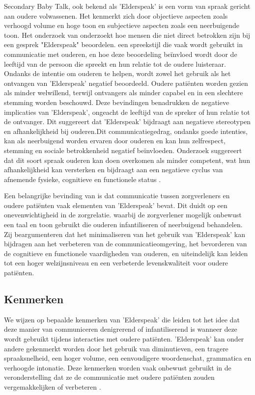 Secondary Baby Talk, ook bekend als 'Elderspeak' is een vorm van spraak gericht aan oudere volwassenen. Het kenmerkt zich door objectieve aspecten zoals verhoogd volume en hoge toon en subjectieve aspecten zoals een neerbuigende toon. Het onderzoek van \textcite{balsis2006evaluations} onderzoekt hoe mensen die niet direct betrokken zijn bij een gesprek "Elderspeak" beoordelen. een spreekstijl die vaak wordt gebruikt in communicatie met ouderen, en hoe deze beoordeling beïnvloed wordt door de leeftijd van de persoon die spreekt en hun relatie tot de oudere luisteraar. 
Ondanks de intentie om ouderen te helpen, wordt zowel het gebruik als het ontvangen van 'Elderspeak' negatief beoordeeld. Oudere patiënten worden gezien als minder welwillend, terwijl ontvangers als minder capabel en in een slechtere stemming worden beschouwd. Deze bevindingen benadrukken de negatieve implicaties van 'Elderspeak', ongeacht de leeftijd van de spreker of hun relatie tot de ontvanger. Dit suggereert dat 'Elderspeak' bijdraagt aan negatieve stereotypen en afhankelijkheid bij ouderen.Dit communicatiegedrag, ondanks goede intenties, kan als neerbuigend worden ervaren door ouderen en kan hun zelfrespect, stemming en sociale betrokkenheid negatief beïnvloeden. Onderzoek suggereert dat dit soort spraak ouderen kan doen overkomen als minder competent, wat hun afhankelijkheid kan versterken en bijdraagt aan een negatieve cyclus van afnemende fysieke, cognitieve en functionele status \autocite{balsis2006evaluations}.


Een belangrijke bevinding van \textcite{williams2005enhancing} is dat communicatie tussen zorgverleners en oudere patiënten vaak elementen van 'Elderspeak' bevat. Dit duidt op een onevenwichtigheid in de zorgrelatie. waarbij de zorgverlener mogelijk onbewust een taal en toon gebruikt die ouderen infantiliseren of neerbuigend behandelen.
 Zij beargumenteren dat het minimaliseren van het gebruik van 'Elderspeak' kan bijdragen aan het verbeteren van de communicatieomgeving, het bevorderen van de cognitieve en functionele vaardigheden van ouderen, en uiteindelijk kan leiden tot een hoger welzijnsniveau en een verbeterde levenskwaliteit voor oudere patiënten.
\subsection{Kenmerken}
We wijzen op bepaalde kenmerken van 'Elderspeak' die leiden tot het idee dat deze manier van communiceren denigrerend of infantiliserend is wanneer deze wordt gebruikt tijdens interacties met oudere patiënten. 'Elderspeak' kan onder andere gekenmerkt worden door het gebruik van diminutieven, een tragere spraaksnelheid, een hoger volume, een eenvoudigere woordenschat, grammatica en verhoogde intonatie. Deze kenmerken worden vaak onbewust gebruikt in de veronderstelling dat ze de communicatie met oudere patiënten zouden vergemakkelijken of verbeteren \autocite{williams2005enhancing}.

